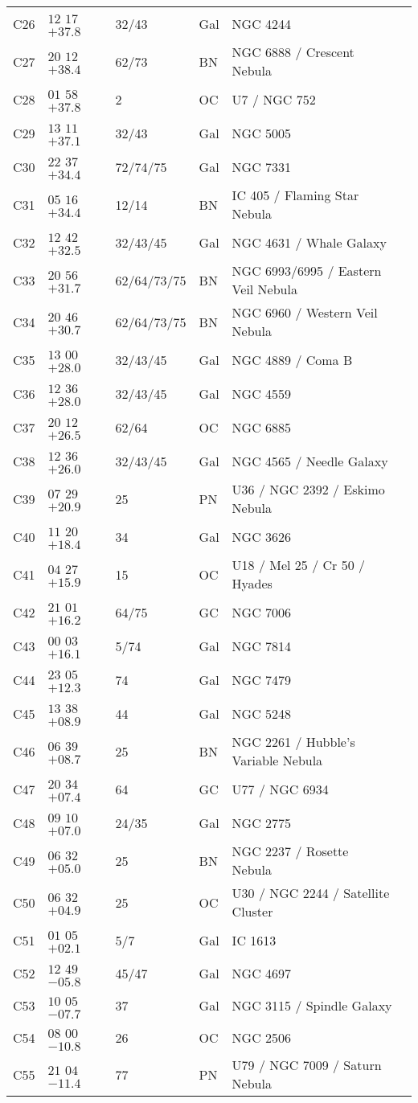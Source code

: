 \begin{table}[p]
\begin{tabular}{llllll}
C26&$12$ $17$ $+37.8$&32/43&Gal&NGC 4244\\
C27&$20$ $12$ $+38.4$&62/73&BN&NGC 6888 / Crescent Nebula\\
C28&$01$ $58$ $+37.8$&2&OC&U7 / NGC 752\\
C29&$13$ $11$ $+37.1$&32/43&Gal&NGC 5005\\
C30&$22$ $37$ $+34.4$&72/74/75&Gal&NGC 7331\\
C31&$05$ $16$ $+34.4$&12/14&BN&IC 405 / Flaming Star Nebula\\
C32&$12$ $42$ $+32.5$&32/43/45&Gal&NGC 4631 / Whale Galaxy\\
C33&$20$ $56$ $+31.7$&62/64/73/75&BN&NGC 6993/6995 / Eastern Veil Nebula\\
C34&$20$ $46$ $+30.7$&62/64/73/75&BN&NGC 6960 / Western Veil Nebula\\
C35&$13$ $00$ $+28.0$&32/43/45&Gal&NGC 4889 / Coma B\\
C36&$12$ $36$ $+28.0$&32/43/45&Gal&NGC 4559\\
C37&$20$ $12$ $+26.5$&62/64&OC&NGC 6885\\
C38&$12$ $36$ $+26.0$&32/43/45&Gal&NGC 4565 / Needle Galaxy\\
C39&$07$ $29$ $+20.9$&25&PN&U36 / NGC 2392 / Eskimo Nebula\\
C40&$11$ $20$ $+18.4$&34&Gal&NGC 3626\\
C41&$04$ $27$ $+15.9$&15&OC&U18 / Mel 25 / Cr 50 / Hyades\\
C42&$21$ $01$ $+16.2$&64/75&GC&NGC 7006\\
C43&$00$ $03$ $+16.1$&5/74&Gal&NGC 7814\\
C44&$23$ $05$ $+12.3$&74&Gal&NGC 7479\\
C45&$13$ $38$ $+08.9$&44&Gal&NGC 5248\\
C46&$06$ $39$ $+08.7$&25&BN&NGC 2261 / Hubble's Variable Nebula\\
C47&$20$ $34$ $+07.4$&64&GC&U77 / NGC 6934\\
C48&$09$ $10$ $+07.0$&24/35&Gal&NGC 2775\\
C49&$06$ $32$ $+05.0$&25&BN&NGC 2237 / Rosette Nebula\\
C50&$06$ $32$ $+04.9$&25&OC&U30 / NGC 2244 / Satellite Cluster\\
C51&$01$ $05$ $+02.1$&5/7&Gal&IC 1613\\
C52&$12$ $49$ $-05.8$&45/47&Gal&NGC 4697\\
C53&$10$ $05$ $-07.7$&37&Gal&NGC 3115 / Spindle Galaxy\\
C54&$08$ $00$ $-10.8$&26&OC&NGC 2506\\
C55&$21$ $04$ $-11.4$&77&PN&U79 / NGC 7009 / Saturn Nebula\\
\hline
\end{tabular}
\end{table}

